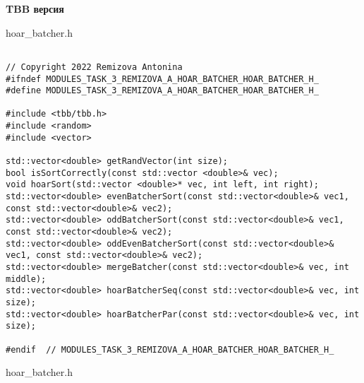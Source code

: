 \documentclass{report}
\begin{document}
\textbf{TBB версия}
\par hoar\_batcher.h
\begin{lstlisting}

// Copyright 2022 Remizova Antonina
#ifndef MODULES_TASK_3_REMIZOVA_A_HOAR_BATCHER_HOAR_BATCHER_H_
#define MODULES_TASK_3_REMIZOVA_A_HOAR_BATCHER_HOAR_BATCHER_H_

#include <tbb/tbb.h>
#include <random>
#include <vector>

std::vector<double> getRandVector(int size);
bool isSortCorrectly(const std::vector <double>& vec);
void hoarSort(std::vector <double>* vec, int left, int right);
std::vector<double> evenBatcherSort(const std::vector<double>& vec1, const std::vector<double>& vec2);
std::vector<double> oddBatcherSort(const std::vector<double>& vec1, const std::vector<double>& vec2);
std::vector<double> oddEvenBatcherSort(const std::vector<double>& vec1, const std::vector<double>& vec2);
std::vector<double> mergeBatcher(const std::vector<double>& vec, int middle);
std::vector<double> hoarBatcherSeq(const std::vector<double>& vec, int size);
std::vector<double> hoarBatcherPar(const std::vector<double>& vec, int size);

#endif  // MODULES_TASK_3_REMIZOVA_A_HOAR_BATCHER_HOAR_BATCHER_H_

\end{lstlisting}
\par hoar\_batcher.h
\end{document}

